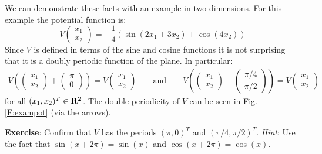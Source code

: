    We can demonstrate these facts with an example in two dimensions.  For
this example the potential function is:
\begin{equation}\label{E:exampot}
   V
\begin{pmatrix}
x_1 \\ x_2 
\end{pmatrix}
= -\frac{1}{4} \left( \sin(2 x_1 + 3 x_2) + \cos(4 x_2) \right)
\end{equation}
Since $V$ is defined in terms of the sine and cosine functions it is not 
surprising that it is a doubly periodic function of the plane.  In particular:
\begin{eqnarray*}
   V \left(
\begin{pmatrix}
x_1 \\ x_2
\end{pmatrix}
+
\begin{pmatrix}
\pi \\ 0
\end{pmatrix} \right)
= V
\begin{pmatrix}
x_1\\ x_2
\end{pmatrix} 
\qquad \mathrm{and} \qquad 
   V \left(
\begin{pmatrix}
x_1 \\ x_2 
\end{pmatrix}
+
\begin{pmatrix}
\pi/4 \\ \pi/2
\end{pmatrix} \right)
= V
\begin{pmatrix}
x_1\\ x_2
\end{pmatrix}
\end{eqnarray*}
for all $(x_1, x_2)^T \in \bf{R}^2$.  The double periodicity of $V$ can be seen
in Fig. \ref{F:exampot} (via the arrows).

\bigskip

\noindent
{\bf Exercise}: Confirm that $V$ has the periods $(\pi,0)^T$ and $(\pi/4, 
\pi/2)^T$.  \emph{Hint}: Use the fact that $\sin(x+2\pi)=\sin(x)$ and 
$\cos(x+2\pi) = \cos(x)$.

\bigskip

